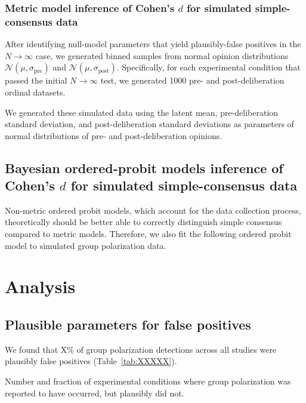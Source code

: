 \documentclass[11pt, letterpaper]{article}
\newcommand{\sigmapre}{\sigma_\mathrm{pre}}
\newcommand{\sigmapost}{\sigma_\mathrm{post}}
\newcommand{\normalpre}{\mathcal{N}(\mu, \sigmapre)}
\newcommand{\normalpost}{\mathcal{N}(\mu, \sigmapost)}
\begin{document}
\subsubsection{Metric model inference of Cohen's $d$ for simulated simple-consensus data}

After identifying null-model parameters that yield plausibly-false positives 
in the $N \to \infty$ case, we generated binned samples from normal opinion 
distributions $\normalpre$ and $\normalpost$. Specifically, for each experimental
condition that passed the initial $N \to \infty$ test, we generated 1000 
pre- and post-deliberation ordinal datasets. 

We generated these simulated data using the latent mean, pre-deliberation 
standard deviation, and post-deliberation standard deviations as parameters of
normal distributions of pre- and post-deliberation opinions. 

\subsection{Bayesian ordered-probit models inference of Cohen's $d$ for simulated
simple-consensus data}

Non-metric ordered probit models, which account for the data collection 
process, theoretically should be better able to correctly
distinguish simple consensus compared to metric models. Therefore, we also fit
the following ordered probit model to simulated group polarization data. 

\section{Analysis}

\subsection{Plausible parameters for false positives}

We found that X\% of group polarization detections across all studies were 
plausibly false positives (Table~\ref{tab:XXXXX}).

\vspace{.5em}
% 
\begin{table}[H]
    \begin{center}
      \caption{Number and fraction of experimental conditions where group polarization was
               reported to have occurred, but plausibly did not.}
      \vspace{.5em}
      
    \end{center}
  \end{table}
\end{document}
